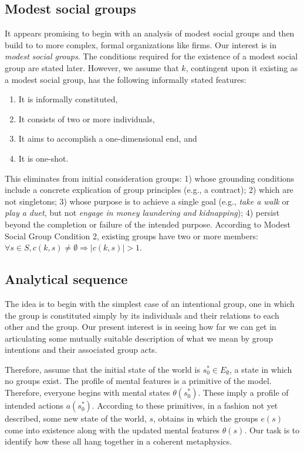 \documentclass[
11pt,
titlepage,
reqno,
]{article}%
\theoremstyle{definition}
\begin{document}
	\subsection{Modest social groups} 
	It appears promising to begin with an analysis of modest social groups and then build to to more complex, formal organizations like firms.  Our interest is in \textit{modest social groups}. The conditions required for the existence of a modest social group are stated later. However, we assume that $k$, contingent upon it existing as a modest social group, has the following informally stated features:
	\begin{enumerate}
		\item It is informally constituted,  
		\item It consists of two or more individuals, 
		\item It aims to accomplish a one-dimensional end, and 
		\item It is one-shot.
	\end{enumerate}
	This eliminates from initial consideration groups: 1) whose grounding conditions include a concrete explication of group principles (e.g., a contract); 2) which are not singletons; 3) whose purpose is to achieve a single goal (e.g., \textit{take a walk} or \textit{play a duet}, but not \textit{engage in money laundering and kidnapping}); 4) persist beyond the completion or failure of the intended purpose. According to Modest Social Group Condition 2, existing groups have two or more members:  $\forall s\in S, c(k,s)\ne\emptyset\Rightarrow |c(k,s)|>1$.  
	
	\subsection{Analytical sequence}
	The idea is to begin with the simplest case of an intentional group, one in which the group is constituted  simply by its individuals and their relations to each other and the group. Our present interest is in seeing how far we can get in articulating some mutually suitable description of what we mean by group intentions and their associated group acts. 
	
	Therefore, assume that the initial state of the world is $s_0^\ast\in E_\emptyset$, a state in which no groups exist. The profile of mental features is a primitive of the model. Therefore, everyone begins with mental states $\theta(s_0^\ast)$. These imply a profile of intended actions $a(s_0^\ast)$. According to these primitives, in a fashion not yet described, some new state of the world, $s$, obtains in which the groups $e(s)$ come into existence along with the updated mental features $\theta(s)$.  Our task is to identify how these all hang together in a coherent metaphysics.
	
\end{document}
